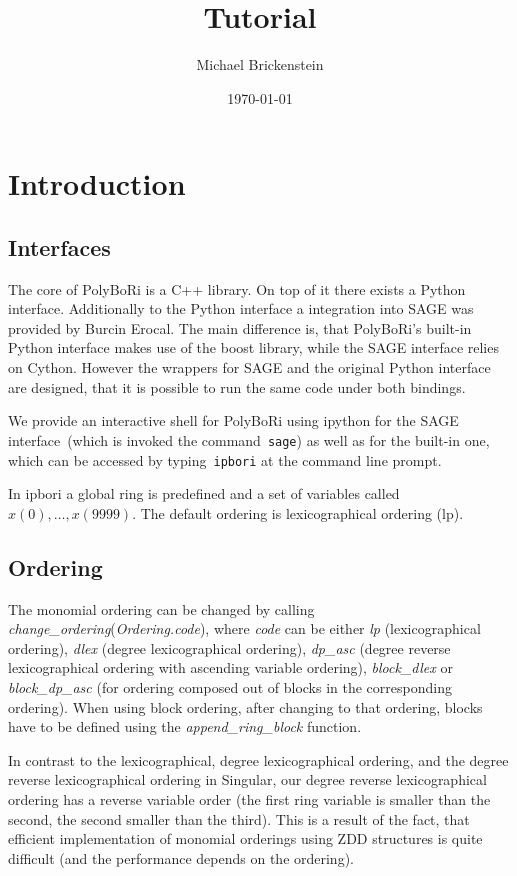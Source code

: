 \documentclass[]{article}
\title{\PolyBoRi Tutorial}
\author{Michael Brickenstein}
\date{\today}
\newcommand{\PolyBoRi}{{\sc PolyBoRi}\xspace}
\newcommand{\functionname}[1]{\textit{#1}\xspace}
\begin{document}
\ifpdf
{}
\else
{}
\fi

\maketitle
\newcommand{\Singular}{{\sc Singular}}



\section{Introduction}
\subsection{Interfaces}
The core of \PolyBoRi is a C++ library. On top of it there exists a Python interface.
Additionally to the Python interface a integration into SAGE was provided by Burcin Erocal.
The main difference is, that \PolyBoRi's built-in Python interface makes use of
the boost library, while the SAGE interface relies on Cython. 
However the wrappers for SAGE and the original Python interface are designed, that it is possible to run the same code under both bindings.

We provide an interactive shell for \PolyBoRi using ipython for the SAGE
interface~(which is invoked the command~\texttt{sage}) as well as for the
built-in one, which can be accessed by typing~\texttt{ipbori}
at the command line prompt.


In ipbori a global ring is predefined and a set of variables called  $x(0), \ldots, x(9999)$. The default ordering is lexicographical ordering (lp).
\subsection{Ordering}
The monomial ordering can be changed by calling
\functionname{change\_ordering}(\functionname{Ordering.code}), where \functionname{code} can be either \functionname{lp} (lexicographical ordering), \functionname{dlex} (degree lexicographical ordering), \functionname{dp\_asc} (degree reverse lexicographical ordering with ascending variable ordering), \functionname{block\_dlex} or \functionname{block\_dp\_asc} (for ordering composed out of blocks in the corresponding ordering). When using block ordering, after changing to that ordering, blocks have to be defined using the \functionname{append\_ring\_block} function.

In contrast to the lexicographical, degree lexicographical ordering, and the degree reverse lexicographical ordering in \Singular, our degree reverse lexicographical ordering has a reverse variable order (the first ring variable is smaller than the second, the second smaller than the third). This is a result of the fact, that efficient implementation of monomial orderings using ZDD structures is quite difficult (and the performance depends on the ordering).
\end{document}
